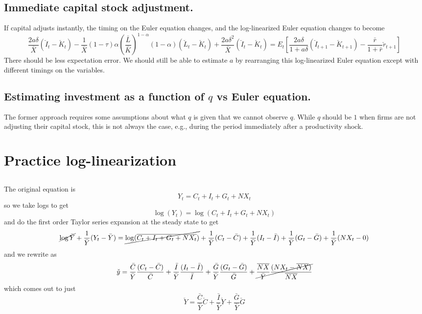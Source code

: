 \documentclass[11pt]{amsart}
\begin{document}
\subsection{Immediate capital stock adjustment.}
If capital adjusts instantly, the timing on the Euler equation changes, and the log-linearized Euler equation changes to become
\begin{dmath*}
	\frac{2a\delta}{\bar{X}}(\check{I}_t - \check{K}_t) - \frac{1}{\bar{X}}(1-\tau)\alpha \left( \frac{\bar{L}}{\bar{K}} \right)^{1-\alpha} (1-\alpha) (\check{L}_t - \check{K}_t) + \frac{2a\delta^2}{\bar{X}}(\check{I}_t - \check{K}_t) = E_t \left[\frac{2a\delta}{1+a\delta} (\check{I}_{t+1} - \check{K}_{t+1}) - \frac{\bar{r}}{1+\bar{r}} \check{r}_{t+1} \right]
\end{dmath*}
There should be less expectation error. We should still be able to estimate $a$ by rearranging this log-linearized Euler equation except with different timings on the variables.

\subsection{Estimating investment as a function of $q$ vs Euler equation.}
The former approach requires some assumptions about what $q$ is given that we cannot observe $q$. While $q$ should be $1$ when firms are not adjusting their capital stock, this is not always the case, e.g., during the period immediately after a productivity shock.

\section{Practice log-linearization}

\subsection{}
The original equation is
\[
Y_t = C_t + I_t + G_t + NX_t
\]
so we take logs to get
\[
\log(Y_t) = \log(C_t + I_t + G_t + NX_t)
\]
and do the first order Taylor series expansion at the steady state to get
\[
\cancel{\log \bar{Y}} + \frac{1}{\bar{Y}} (Y_t - \bar{Y}) = \cancel{\log(\overline{C_t + I_t + G_t + NX_t})} + \frac{1}{\bar{Y}} (C_t - \bar{C}) + \frac{1}{\bar{Y}} (I_t - \bar{I}) + \frac{1}{\bar{Y}} (G_t - \bar{G}) + \frac{1}{\bar{Y}} (NX_t - 0)
\]
and we rewrite as
\[
\check{y} = \frac{\bar{C}}{\bar{Y}} \frac{(C_t - \bar{C})}{\bar{C}} + \frac{\bar{I}}{\bar{Y}} \frac{(I_t - \bar{I})}{\bar{I}} + \frac{\bar{G}}{\bar{Y}} \frac{(G_t - \bar{G})}{\bar{G}} + \cancel{\frac{\overline{NX}}{\bar{Y}} \frac{(NX_t - \overline{NX})}{\overline{NX}}}
\]
which comes out to just
\[
\check{Y} = \frac{\bar{C}}{\bar{Y}} \check{C} + \frac{\bar{I}}{\bar{Y}} \check{Y} + \frac{\bar{G}}{\bar{Y}} \check{G}
\]
\end{document}
